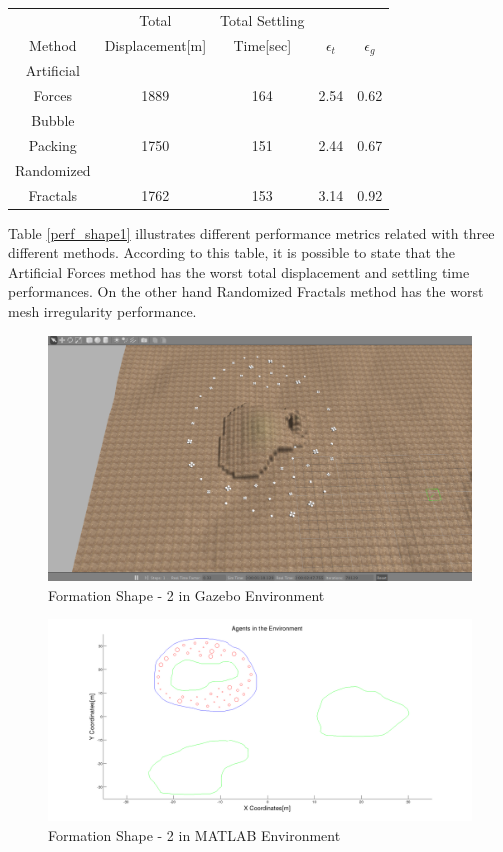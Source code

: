 \begin{center}
 \label{perf_shape1} 
\begin{tabular}{|c|c|c|c|c|}
					
\hline
 & Total  & Total Settling & &  \\ Method & Displacement[m] & Time[sec]& \textbf{$\epsilon_t$} & \textbf{$\epsilon_g$} \\
\hline
Artificial&  &  &  & \\
 Forces & 1889 & 164& 2.54 & 0.62\\
 \hline
 Bubble&  &  &  & \\
 Packing &1750 &151 &2.44 & 0.67\\
\hline
 Randomized&  &  &  & \\
 Fractals &1762 &153 &3.14 & 0.92\\
\hline
\end{tabular}
\end{center}
Table \ref{perf_shape1} illustrates different performance metrics related with three different methods. According to this table, it is possible to state that the Artificial Forces method has the worst total displacement and settling time performances. On the other hand Randomized Fractals method has the worst mesh irregularity performance.
\begin{figure}[H]
\caption{Formation Shape - 2 in Gazebo Environment}
\centerline{\includegraphics[scale = 0.32]{2_Gazebo}}
\end{figure} 
		 
\begin{figure}[H]
\caption{Formation Shape - 2 in MATLAB Environment}
\centerline{\includegraphics[scale = 0.32]{2}}
\end{figure} 
		 

